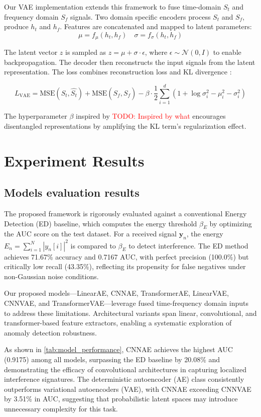 \documentclass[12pt]{article}
\newcommand{\todo}[1]{\textcolor{red}{TODO: #1}}
\begin{document}
Our VAE implementation extends this framework to fuse time-domain $S_t  $ and frequency domain $S_f$ signals. Two domain specific encoders process $S_t$ and $S_f$, produce $h_t$ and $h_f$. Features are concatenated and mapped to latent parameters:
$$
    \mu = f_{\mu}(h_t , h_f) \quad \sigma = f_{\sigma}(h_t , h_f)
$$

The latent vector $z$ is sampled as $z = \mu + \sigma \cdot \epsilon$, where $\epsilon \sim \mathcal{N}(0, I)$ to enable backpropagation. The decoder then reconstructs the input signals from the latent representation. The loss combines reconstruction loss and KL divergence :

$$
    L_{\text{VAE}} = \text{MSE}(S_t, \hat{S_t})+ \text{MSE}(S_f, \hat{S_f}) - \beta \cdot \frac{1}{2} \sum_{i=1}^{d }(1 + \log \sigma_{i}^{2} - \mu_i^{2} - \sigma_i^{2})
$$

The hyperparameter $\beta$ inspired by \todo{Inspired by what } encourages disentangled representations by amplifying the KL term’s regularization effect.

\section{Experiment Results}

\subsection{Models evaluation results}

The proposed framework is rigorously evaluated against a conventional Energy Detection (ED) baseline, which computes the energy threshold $\beta_E$ by optimizing the AUC score on the test dataset. For a received signal $\mathbf{y}_n$, the energy $E_n = \sum_{i=1}^N |y_n[i]|^2$ is compared to $\beta_E$ to detect interference. The ED method achieves 71.67\% accuracy and 0.7167 AUC, with perfect precision (100.0\%) but critically low recall (43.35\%), reflecting its propensity for false negatives under non-Gaussian noise conditions.

Our proposed models—LinearAE, CNNAE, TransformerAE, LinearVAE, CNNVAE, and TransformerVAE—leverage fused time-frequency domain inputs to address these limitations. Architectural variants span linear, convolutional, and transformer-based feature extractors, enabling a systematic exploration of anomaly detection robustness.

As shown in \autoref{tab:model_performance}, CNNAE achieves the highest AUC (0.9175) among all models, surpassing the ED baseline by 20.08\% and demonstrating the efficacy of convolutional architectures in capturing localized interference signatures. The deterministic autoencoder (AE) class consistently outperforms variational autoencoders (VAE), with CNNAE exceeding CNNVAE by 3.51\% in AUC, suggesting that probabilistic latent spaces may introduce unnecessary complexity for this task.
\end{document}
